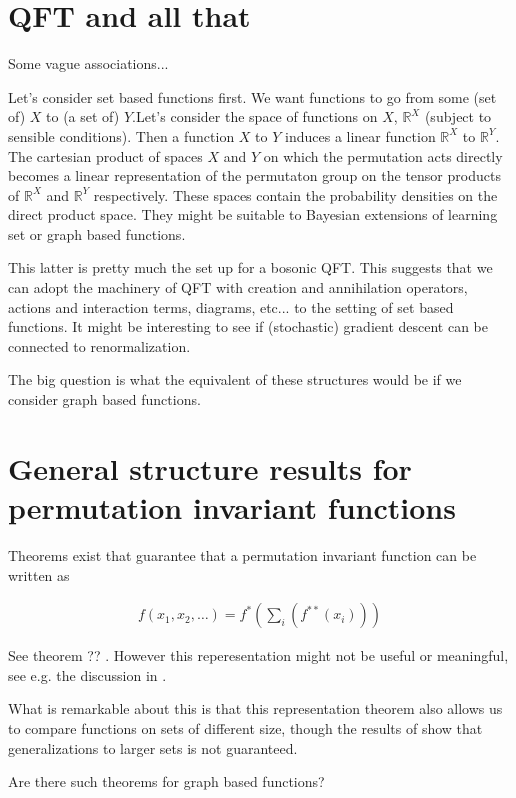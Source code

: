 \documentclass[reprint,twocolumn,amsmath,amssymb,aps]{revtex4-1}
\begin{document}
\section{QFT and all that}

Some vague associations...

Let's consider set based functions first. We want functions to go from some (set of) $X$ to (a set of) $Y$.Let's consider the space of functions on $X$, $\mathbb{R}^X$ (subject to sensible conditions). Then a function $X$ to $Y$ induces a linear function $\mathbb{R}^X$ to $\mathbb{R}^Y$. The cartesian product of spaces $X$ and $Y$ on which the permutation acts directly becomes a linear representation of the permutaton group on the tensor products of $\mathbb{R}^X$ and $\mathbb{R}^Y$ respectively. These spaces contain the probability densities on the direct product space. They might be suitable to Bayesian extensions of learning set or graph based functions.

This latter is pretty much the set up for a bosonic QFT. This suggests that we can adopt the machinery of QFT with creation and annihilation operators, actions and interaction terms, diagrams, etc... to the setting of set based functions. It might be interesting to see if (stochastic) gradient descent can be connected to renormalization.

The big question is what the equivalent of these structures would be if we consider graph based functions.

\section{General structure results for permutation invariant functions}

Theorems exist that guarantee that a permutation invariant function can be written as

\begin{align}
f(x_1, x_2, \dots) = f^* \left(\sum_i (f^{**}(x_i))\right)
\end{align}

See theorem ?? \citet{zaheer2017deep}. However this reperesentation might not be useful or meaningful, see e.g. the discussion in \citet{wagstaff2019limitations}.

What is remarkable about this is that this representation theorem also allows us to compare functions on sets of different size, though the results of \citet{wagstaff2019limitations} show that generalizations to larger sets is not guaranteed.

Are there such theorems for graph based functions?


\end{document}
